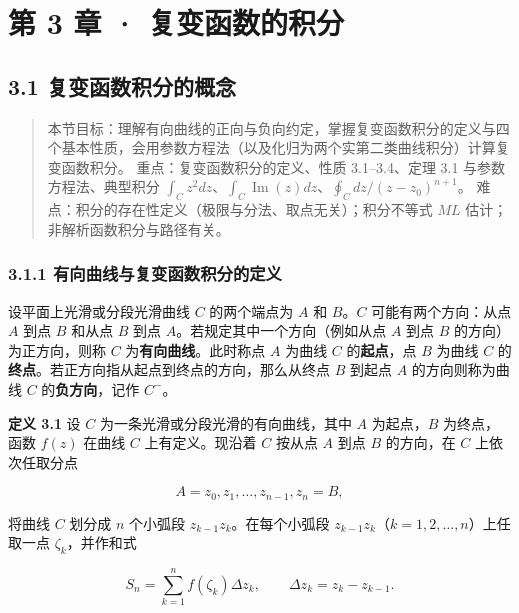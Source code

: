 \chapter{第 3 章 ·
复变函数的积分}\label{ux7b2c-3-ux7ae0-ux590dux53d8ux51fdux6570ux7684ux79efux5206}

\section{3.1
复变函数积分的概念}\label{ux590dux53d8ux51fdux6570ux79efux5206ux7684ux6982ux5ff5}

\begin{quote}
本节目标：理解有向曲线的正向与负向约定，掌握复变函数积分的定义与四个基本性质，会用参数方程法（以及化归为两个实第二类曲线积分）计算复变函数积分。
重点：复变函数积分的定义、性质 3.1--3.4、定理 3.1 与参数方程法、典型积分
\(\int_C z^2dz\)、\(\int_C\operatorname{Im}(z)dz\)、\(\oint_C d z/(z-z_0)^{n+1}\)。
难点：积分的存在性定义（极限与分法、取点无关）；积分不等式 \(ML\)
估计；非解析函数积分与路径有关。
\end{quote}

\subsection{3.1.1
有向曲线与复变函数积分的定义}\label{ux6709ux5411ux66f2ux7ebfux4e0eux590dux53d8ux51fdux6570ux79efux5206ux7684ux5b9aux4e49}

设平面上光滑或分段光滑曲线 \(C\) 的两个端点为 \(A\) 和 \(B\)。\(C\)
可能有两个方向：从点 \(A\) 到点 \(B\) 和从点 \(B\) 到点
\(A\)。若规定其中一个方向（例如从点 \(A\) 到点 \(B\)
的方向）为正方向，则称 \(C\) 为\textbf{有向曲线}。此时称点 \(A\) 为曲线
\(C\) 的\textbf{起点}，点 \(B\) 为曲线 \(C\)
的\textbf{终点}。若正方向指从起点到终点的方向，那么从终点 \(B\) 到起点
\(A\) 的方向则称为曲线 \(C\) 的\textbf{负方向}，记作 \(C^-\)。

\textbf{定义 3.1} 设 \(C\) 为一条光滑或分段光滑的有向曲线，其中 \(A\)
为起点，\(B\) 为终点，函数 \(f(z)\) 在曲线 \(C\) 上有定义。现沿着 \(C\)
按从点 \(A\) 到点 \(B\) 的方向，在 \(C\) 上依次任取分点

\[
A=z_0,z_1,\dots,z_{n-1},z_n=B,
\]

将曲线 \(C\) 划分成 \(n\) 个小弧段 \(z_{k-1}z_k\)。在每个小弧段
\(z_{k-1}z_k\)（\(k=1,2,\dots,n\)）上任取一点 \(\zeta_k\)，并作和式

\[
S_n=\sum_{k=1}^{n}f(\zeta_k)\Delta z_k,\qquad \Delta z_k=z_k-z_{k-1}.
\]

